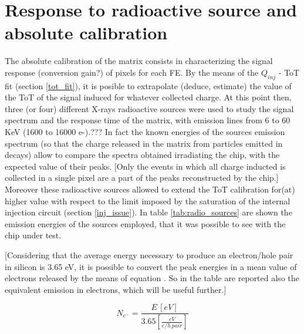 \section{Response to radioactive source and absolute calibration} \label{source_ana}


The absolute calibration of the matrix consists in characterizing the signal response (conversion gain?) of pixels for each FE. By the means of the $Q_{inj}$ - ToT fit (section \ref{tot_fit}), it is posible to extrapolate (deduce, estimate) the value of the ToT of the signal induced for whatever collected charge. At this point then, three (or four) different X-rays radioactive sources were used to study the signal spectrum and the response time of the matrix, with emission lines from 6 to 60 KeV (1600 to 16000 e-).??? 
In fact the known energies of the sources emission spectrum (so that the charge released in the matrix from particles emitted in decays) allow to compare the spectra obtained irradiating the chip, with the expected value of their peaks. [Only the events in which all charge inducted is collected in a single pixel are a part of the peaks reconstructed by the chip.]\\
Moreover these radioactive sources allowed to extend the ToT calibration for(at) higher value with respect to the limit imposed by the saturation of the internal injection circuit (section \ref{inj_issue}). In table \vref{tab:radio_sources} are shown the emission energies of the sources employed, that it was possible to see with the chip under test.

[Considering that the average energy necessary to produce an electron/hole pair in silicon is 3.65 eV, it is possible to convert the peak energies in a mean value of electrons released by the means of equation . So in the table are reported also the equivalent emission in electrons, which will be useful further.]

\begin{equation}
N_{e^{-}} = \frac{E \, [eV]}{3.65 [\frac{eV}{e/h \, pair}]}
\label{energy_electron_conv}
\end{equation}


